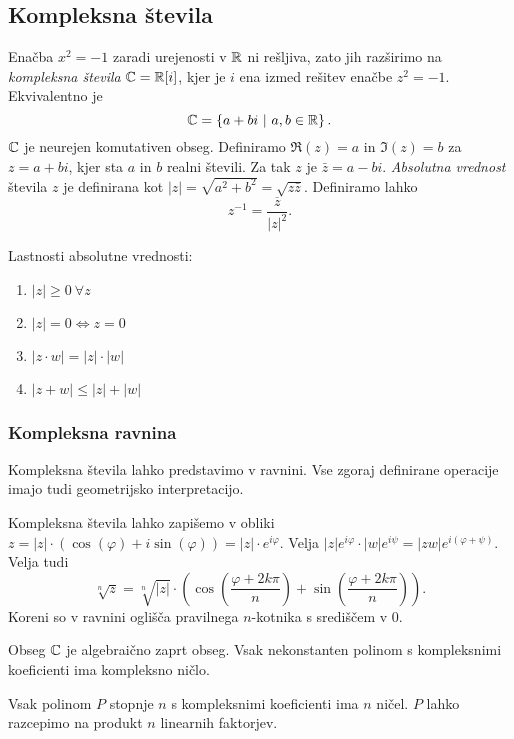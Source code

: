\documentclass[12pt, a4paper]{article}
\begin{document}
\newpage

\subsection{Kompleksna števila}

Enačba $x^2=-1$ zaradi urejenosti v $\mathbb{R}$ ni rešljiva, zato jih razširimo na \emph{kompleksna števila} $\mathbb{C}=\mathbb{R}[i]$, kjer je $i$ ena izmed rešitev enačbe $z^2=-1$. Ekvivalentno je
\[
\mathbb{C}=\left\{a+bi~\middle\vert~a,b\in\mathbb{R}\right\}.
\]
$\mathbb{C}$ je neurejen komutativen obseg. Definiramo $\Re(z)=a$ in $\Im(z)=b$ za $z=a+bi$, kjer sta $a$ in $b$ realni števili. Za tak $z$ je $\bar{z}=a-bi$. \emph{Absolutna vrednost} števila $z$ je definirana kot $|z|=\sqrt{a^2+b^2}=\sqrt{z\bar{z}}$. Definiramo lahko
\[
z^{-1}=\frac{\overline{z}}{|z|^2}.
\]

Lastnosti absolutne vrednosti:

\begin{enumerate}[label=\roman*)]
\item $|z|\geq 0~\forall z$
\item $|z|=0\iff z=0$
\item $|z\cdot w|=|z|\cdot|w|$
\item $|z+w|\leq |z|+|w|$
\end{enumerate}

\subsubsection{Kompleksna ravnina}
Kompleksna števila lahko predstavimo v ravnini. Vse zgoraj definirane operacije imajo tudi geometrijsko interpretacijo.

Kompleksna števila lahko zapišemo v obliki $z=|z|\cdot(\cos(\varphi)+i\sin(\varphi))=|z|\cdot e^{i\varphi}.$ Velja $|z|e^{i\varphi}\cdot |w|e^{i\psi}=|zw|e^{i(\varphi+\psi)}$. Velja tudi
\[
\sqrt[n]{z}=\sqrt[n]{|z|}\cdot\left(\cos\left(\frac{\varphi+2k\pi}{n}\right)+\sin\left(\frac{\varphi+2k\pi}{n}\right)\right).
\]
Koreni so v ravnini oglišča pravilnega $n$-kotnika s središčem v $0$.

\begin{izrek}
Obseg $\mathbb{C}$ je algebraično zaprt obseg. Vsak nekonstanten polinom s kompleksnimi koeficienti ima kompleksno ničlo.
\end{izrek}

\begin{posledica}
Vsak polinom $P$ stopnje $n$ s kompleksnimi koeficienti ima $n$ ničel. $P$ lahko razcepimo na produkt $n$ linearnih faktorjev.
\end{posledica}
\end{document}
